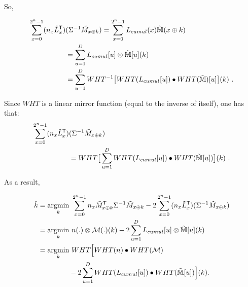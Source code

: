 \documentclass[conference,twocolumn]{IEEEtran}
\DeclareMathOperator*\argmin{argmin}
\begin{document}
So, 

\begin{align*}
\sum_{x=0}^{2^n-1}(n_x \Tilde{L}^\mathsf{T}_x)&(\Sigma^{-1}\Tilde{M}_{x\oplus k}) 
= \sum_{x=0}^{2^n-1} L_{cumul}(x)  \Tilde{\mathbb{M}}(x\oplus k)\\
&= \sum_{u=1}^{D} L_{cumul}[u] \otimes \Tilde{\mathbb{M}}[u](k)\\
&=\sum_{u=1}^{D} WHT^{-1}\big[WHT(L_{cumul}[u]) \bullet WHT(\Tilde{\mathbb{M}})[u]\big](k) \ .%
\end{align*}

Since $WHT$ is a linear mirror function (equal to the inverse of itself), one has that:
\begin{align*}
    \sum_{x=0}^{2^n-1}(n_x \Tilde{L}^\mathsf{T}_x)&(\Sigma^{-1}\Tilde{M}_{x\oplus k}) \\
    & =WHT\big[\sum_{u=1}^{D} WHT(L_{cumul}[u]) \bullet WHT(\Tilde{\mathbb{M}}[u])\big](k) \ .
\label{Old_TA}
\end{align*}

As a result,

\begin{align*}
\Hat{k} = \argmin_k& \  \sum_{x=0}^{2^n-1} n_x \Tilde{M}^\mathsf{T}_{x \oplus k} \Sigma^{-1}  \Tilde{M}_{x \oplus k} - 2\sum_{x=0}^{2^n-1}(n_x \Tilde{L}^\mathsf{T}_x)(\Sigma^{-1}\Tilde{M}_{x\oplus k}) \\
=\argmin_k & \  n(.)\otimes \mathcal{M}(.)(k) -2 \sum_{u=1}^{D} L_{cumul}[u] \otimes \Tilde{\mathbb{M}}[u](k)\\
=\argmin_k & \  WHT\Big[WHT(n) \bullet WHT(\mathcal{M}) \\& -2\sum_{u=1}^{D} WHT(L_{cumul}[u]) \bullet WHT(\Tilde{\mathbb{M}}[u])\Big](k).
\end{align*} 
\end{document}
